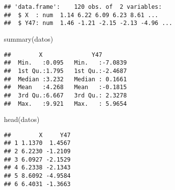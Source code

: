 \documentclass[
]{article}
\newenvironment{Shaded}{\begin{snugshade}}{\end{snugshade}}
\newcommand{\AttributeTok}[1]{\textcolor[rgb]{0.77,0.63,0.00}{#1}}
\newcommand{\CommentTok}[1]{\textcolor[rgb]{0.56,0.35,0.01}{\textit{#1}}}
\newcommand{\FunctionTok}[1]{\textcolor[rgb]{0.00,0.00,0.00}{#1}}
\newcommand{\NormalTok}[1]{#1}
\newcommand{\OtherTok}[1]{\textcolor[rgb]{0.56,0.35,0.01}{#1}}
\newcommand{\StringTok}[1]{\textcolor[rgb]{0.31,0.60,0.02}{#1}}
\begin{document}
\begin{Shaded}
\end{Shaded}

\begin{verbatim}
## 'data.frame':    120 obs. of  2 variables:
##  $ X  : num  1.14 6.22 6.09 6.23 8.61 ...
##  $ Y47: num  1.46 -1.21 -2.15 -2.13 -4.96 ...
\end{verbatim}

\begin{Shaded}
\begin{Highlighting}[]
\FunctionTok{summary}\NormalTok{(datos)}
\end{Highlighting}
\end{Shaded}

\begin{verbatim}
##        X              Y47         
##  Min.   :0.095   Min.   :-7.0839  
##  1st Qu.:1.795   1st Qu.:-2.4687  
##  Median :3.232   Median : 0.1661  
##  Mean   :4.268   Mean   :-0.1815  
##  3rd Qu.:6.667   3rd Qu.: 2.3278  
##  Max.   :9.921   Max.   : 5.9654
\end{verbatim}

\begin{Shaded}
\begin{Highlighting}[]
\FunctionTok{head}\NormalTok{(datos)}
\end{Highlighting}
\end{Shaded}

\begin{verbatim}
##        X     Y47
## 1 1.1370  1.4567
## 2 6.2230 -1.2109
## 3 6.0927 -2.1529
## 4 6.2338 -2.1343
## 5 8.6092 -4.9584
## 6 6.4031 -1.3663
\end{verbatim}
\end{document}
